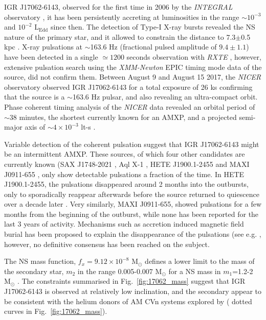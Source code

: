 \documentclass[graybox]{svmult}
\def \inte {{\em INTEGRAL\xspace}}
\def \xmm {{\em XMM-Newton\xspace}}
\def \rxte {{\em RXTE\xspace}}
\def \nicer{{\em NICER\xspace}}
\begin{document}
IGR J17062-6143, observed for the first time in 2006 by the \inte{} observatory \cite{Churazov2007}, it has been persistently accreting at luminosities in the range $\sim10^{-3}$ and $10^{-2}$ L$_\text{Edd}$ since then. The detection of Type-I X-ray bursts \cite{Degenaar2013} revealed the NS nature of the primary star, and it allowed to constrain the distance to 7.3$\pm$0.5 kpc \cite{Keek2017}.
X-ray pulsations at $\sim$163.6 Hz (fractional pulsed amplitude of $9.4\pm1.1$) have been detected in a single $\simeq 1200$ seconds observation with \rxte{} \cite{Strohmayer2017}, however, extensive pulsation search using the \xmm{} EPIC timing mode data of the source, did not confirm them.
Between August 9 and August 15 2017, the \nicer{} observatory observed IGR J17062-6143 for a total exposure of 26 ks confirming that the source is a $\sim$163.6 Hz pulsar, and also revealing an ultra-compact orbit. Phase coherent timing analysis of the \nicer{} data revealed an orbital period of $\sim38$ minutes, the shortest currently known for an AMXP, and a projected semi-major axis of $\sim4\times10^{-3}$ lt-s \cite{Strohmayer2018}.  

Variable detection of the coherent pulsation suggest that IGR J17062-6143 might be an intermittent AMXP. These sources, of which four other candidates are currently known (SAX J1748-2021 \cite{Altamirano2008,Sanna2016}, Aql X-1 \cite{Casella2008}, HETE J1900.1-2455 \cite{Kaaret2006} and MAXI J0911-655 \cite{Sanna2017a}, only show detectable pulsations a fraction of the time. In HETE J1900.1-2455, the pulsations disappeared around 2 months into the outbursts, only to sporadically reappear afterwards \cite{Patruno2012a} before the source returned to quiescence over a decade later \cite{Degenaar2017b}. Very similarly, MAXI J0911-655, showed pulsations for a few months from the beginning of the outburst, while none has been reported for the last 3 years of activity. Mechanisms such as accretion induced magnetic field burial has been proposed to explain the disappearance of the pulsations (see e.g. \cite{Cumming2001}, however, no definitive consensus has been reached on the subject. 

The NS mass function, $f_x=9.12\times 10^ {-8}$ M$_\odot$ defines a lower limit to the mass of the secondary star, $m_2$ in the range 0.005-0.007 M$_\odot$ for a NS mass in $m_1$=1.2-2 M$_\odot$ \cite{Strohmayer2018}. The constraints summarised in Fig.~\ref{fig:17062_mass} suggest that IGR J17062-6143
is observed at relatively low inclination, and the secondary appear to be consistent with the helium donors of AM CVn systems explored by \cite{Deloye2007} (
dotted curves in Fig.~\ref{fig:17062_mass}).
\end{document}
